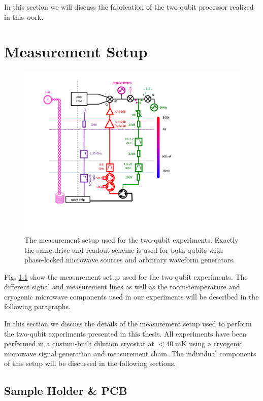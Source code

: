 In this section we will discuss the fabrication of the two-qubit processor realized in this work.

\chapter{Measurement Setup}

\begin{figure}[ht!]
	\centering
		\includegraphics[width=1.\textwidth]{"./material/figures/2-qubit-processor/measurement setup"}
	\caption[The measurement setup used for the two-qubit experiments]{The measurement setup used for the two-qubit experiments. Exactly the same drive and readout scheme is used for both qubits with phase-locked microwave sources and arbitrary waveform generators.}
	\label{fig:MeasurementSetup}
\end{figure}

Fig. \ref{fig:MeasurementSetup} show the measurement setup used for the two-qubit experiments. The different signal and measurement lines as well as the room-temperature and cryogenic microwave components used in our experiments will be described in the following paragraphs.

In this section we discuss the details of the measurement setup used to perform the two-qubit experiments presented in this thesis. All experiments have been performed in a custum-built dilution cryostat at $< 40 \; \mathrm{mK}$ using a cryogenic microwave signal generation and measurement chain. The individual components of this setup will be discussed in the following sections.

\section{Sample Holder \& PCB}

